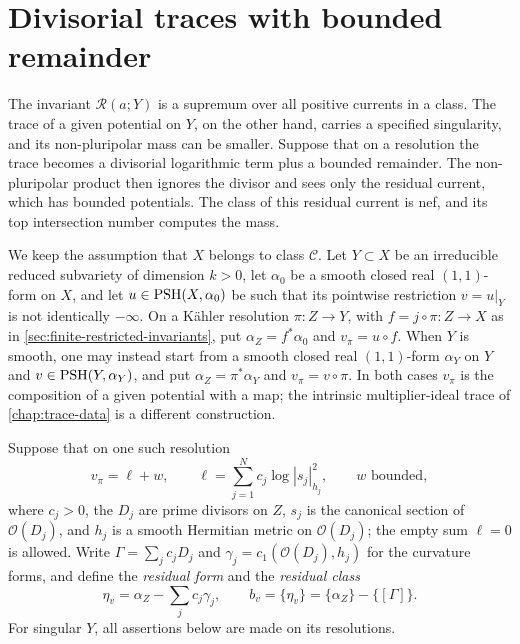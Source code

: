 \section{Divisorial traces with bounded remainder}
\label{sec:resolved-trace-masses}

The invariant $\mathcal R(a;Y)$ is a supremum over all positive currents in a class. The trace of a given potential on $Y$, on the other hand, carries a specified singularity, and its non-pluripolar mass can be smaller. Suppose that on a resolution the trace becomes a divisorial logarithmic term plus a bounded remainder. The non-pluripolar product then ignores the divisor and sees only the residual current, which has bounded potentials. The class of this residual current is nef, and its top intersection number computes the mass.

We keep the assumption that $X$ belongs to class $\mathcal C$. Let $Y\subset X$ be an irreducible reduced subvariety of dimension $k>0$, let $\alpha_0$ be a smooth closed real $(1,1)$-form on $X$, and let $u\in\mathrm{PSH}(X,\alpha_0)$ be such that its pointwise restriction $v=u|_Y$ is not identically $-\infty$. On a K\"ahler resolution $\pi\colon Z\to Y$, with $f=j\circ\pi\colon Z\to X$ as in \cref{sec:finite-restricted-invariants}, put $\alpha_Z=f^*\alpha_0$ and $v_\pi=u\circ f$. When $Y$ is smooth, one may instead start from a smooth closed real $(1,1)$-form $\alpha_Y$ on $Y$ and $v\in\mathrm{PSH}(Y,\alpha_Y)$, and put $\alpha_Z=\pi^*\alpha_Y$ and $v_\pi=v\circ\pi$. In both cases $v_\pi$ is the composition of a given potential with a map; the intrinsic multiplier-ideal trace of \cref{chap:trace-data} is a different construction.

Suppose that on one such resolution
\begin{equation}\label{eq:resolved-trace-decomposition}
 v_\pi=\ell+w,
 \qquad \ell=\sum_{j=1}^N c_j\log|s_j|_{h_j}^2,
 \qquad w\text{ bounded},
\end{equation}
where $c_j>0$, the $D_j$ are prime divisors on $Z$, $s_j$ is the canonical section of $\mathcal O(D_j)$, and $h_j$ is a smooth Hermitian metric on $\mathcal O(D_j)$; the empty sum $\ell=0$ is allowed. Write $\Gamma=\sum_jc_jD_j$ and $\gamma_j=c_1(\mathcal O(D_j),h_j)$ for the curvature forms, and define the \emph{residual form} and the \emph{residual class}
\begin{equation}\label{eq:resolved-trace-residual-class}
 \eta_v=\alpha_Z-\sum_jc_j\gamma_j,
 \qquad b_v=\{\eta_v\}=\{\alpha_Z\}-\{[\Gamma]\}.
\end{equation}
For singular $Y$, all assertions below are made on its resolutions.

